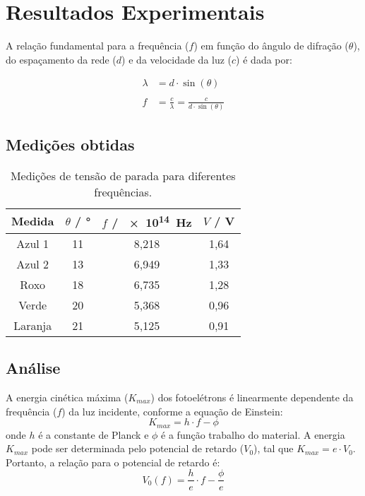 \documentclass[conference]{IEEEtran}
\begin{document}
\section{Resultados Experimentais}

A relação fundamental para a frequência ($f$) em função do ângulo de difração ($\theta$), do espaçamento da rede ($d$) e da velocidade da luz ($c$) é dada por:

\begin{align}
\lambda &= d \cdot \sin(\theta) \\
\\
f &= \frac{c}{\lambda} = \frac{c}{d \cdot \sin(\theta)}
\end{align}

\subsection{Medições obtidas}
\begin{table}[H]
\centering
\caption{Medições de tensão de parada para diferentes frequências.}
\label{tab:medicoes}
\begin{tabular}{cccc}
 \toprule
\textbf{Medida} & \textbf{$\theta$ / \si{\degree}} & \textbf{$f$ / \SI{e14}{\hertz}} & \textbf{$V$ / \si{\volt}} \\
\midrule
Azul 1 & 11 & 8,218 & 1,64 \\
Azul 2 & 13 & 6,949 & 1,33 \\
Roxo & 18 & 6,735 & 1,28 \\
Verde & 20 & 5,368 & 0,96 \\
Laranja & 21 & 5,125 & 0,91 \\
\bottomrule
\end{tabular}
\end{table}

\subsection{Análise}
A energia cinética máxima ($K_{max}$) dos fotoelétrons é linearmente dependente da frequência ($f$) da luz incidente, conforme a equação de Einstein:
\begin{equation}
K_{max} = h \cdot f - \phi
\end{equation}
onde $h$ é a constante de Planck e $\phi$ é a função trabalho do material. A energia $K_{max}$ pode ser determinada pelo potencial de retardo ($V_0$), tal que $K_{max} = e \cdot V_0$. Portanto, a relação para o potencial de retardo é:
\begin{equation}
V_0(f) = \frac{h}{e} \cdot f - \frac{\phi}{e}
\end{equation}
\end{document}
